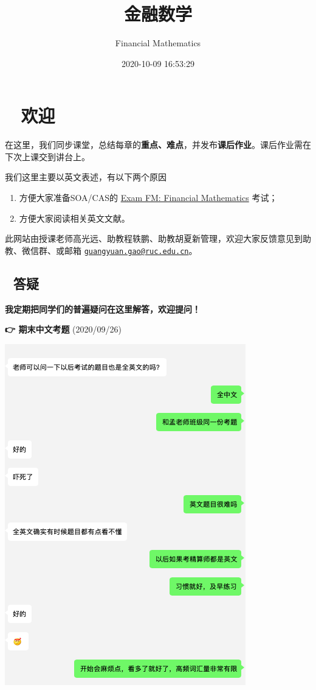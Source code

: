 \documentclass[
]{book}
\title{金融数学}
\author{Financial Mathematics}
\date{2020-10-09 16:53:29}
\begin{document}
\maketitle

{
\setcounter{tocdepth}{1}
\tableofcontents
}
\hypertarget{ux6b22ux8fce}{%
\chapter*{👨‍🏫 欢迎}\label{ux6b22ux8fce}}

在这里，我们同步课堂，总结每章的\textbf{重点、难点}，并发布\textbf{课后作业}。课后作业需在下次上课交到讲台上。

我们这里主要以英文表述，有以下两个原因

\begin{enumerate}
\def\labelenumi{\arabic{enumi}.}
\item
  方便大家准备SOA/CAS的 \href{https://www.soa.org/education/exam-req/edu-exam-fm-detail/}{Exam FM: Financial Mathematics} 考试；
\item
  方便大家阅读相关英文文献。
\end{enumerate}

此网站由授课老师高光远、助教程轶鹏、助教胡夏新管理，欢迎大家反馈意见到助教、微信群、或邮箱 \href{mailto:guangyuan.gao@ruc.edu.cn}{\nolinkurl{guangyuan.gao@ruc.edu.cn}}。

\hypertarget{ux7b54ux7591}{%
\section*{🤔 答疑}\label{ux7b54ux7591}}

\textbf{我定期把同学们的普遍疑问在这里解答，欢迎提问！}

\textbf{👉 期末中文考题} (2020/09/26)

\begin{center}\includegraphics[width=0.3\linewidth]{./plots/english} \end{center}
\end{document}
